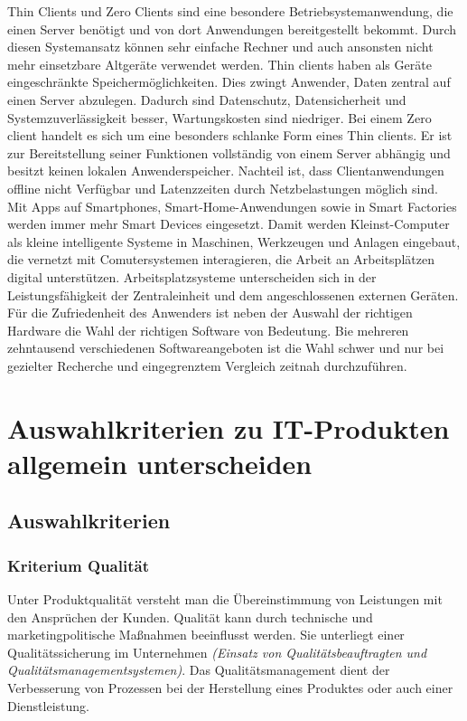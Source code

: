 \documentclass[a4paper, 12pt]{report}
\begin{document}
Thin Clients und Zero Clients sind eine besondere Betriebsystemanwendung, die 
einen Server benötigt und von dort Anwendungen bereitgestellt bekommt. Durch 
diesen Systemansatz können sehr einfache Rechner und auch ansonsten nicht mehr
einsetzbare Altgeräte verwendet werden. Thin clients haben als Geräte 
eingeschränkte Speichermöglichkeiten. Dies zwingt Anwender, Daten zentral auf 
einen Server abzulegen. Dadurch sind Datenschutz, Datensicherheit und 
Systemzuverlässigkeit besser, Wartungskosten sind niedriger. Bei einem Zero 
client handelt es sich um eine besonders schlanke Form eines Thin clients. 
Er ist zur Bereitstellung seiner Funktionen vollständig von einem Server 
abhängig und besitzt keinen lokalen Anwenderspeicher. Nachteil ist, dass 
Clientanwendungen offline nicht Verfügbar und Latenzzeiten durch Netzbelastungen 
möglich sind. \\

Mit Apps auf Smartphones, Smart-Home-Anwendungen sowie in Smart Factories werden
immer mehr Smart Devices eingesetzt. Damit werden Kleinst-Computer als kleine 
intelligente Systeme in Maschinen, Werkzeugen und Anlagen eingebaut, die 
vernetzt mit Comutersystemen interagieren, die Arbeit an Arbeitsplätzen digital
unterstützen. Arbeitsplatzsysteme unterscheiden sich in der Leistungsfähigkeit 
der Zentraleinheit und dem angeschlossenen externen Geräten. \\

Für die Zufriedenheit des Anwenders ist neben der Auswahl der richtigen Hardware
die Wahl der richtigen Software von Bedeutung. Bie mehreren zehntausend 
verschiedenen Softwareangeboten ist die Wahl schwer und nur bei gezielter 
Recherche und eingegrenztem Vergleich zeitnah durchzuführen. 

\section{Auswahlkriterien zu IT-Produkten allgemein unterscheiden}

\subsection{Auswahlkriterien}

\subsubsection{Kriterium Qualität}

Unter Produktqualität versteht man die Übereinstimmung von Leistungen mit den 
Ansprüchen der Kunden. Qualität kann durch technische und marketingpolitische 
Maßnahmen beeinflusst werden. Sie unterliegt einer Qualitätssicherung im 
Unternehmen \emph{(Einsatz von Qualitätsbeauftragten und 
Qualitätsmanagementsystemen)}. Das Qualitätsmanagement dient der Verbesserung 
von Prozessen bei der Herstellung eines Produktes oder auch einer 
Dienstleistung. \\
\end{document}
